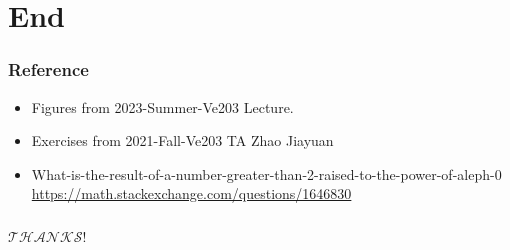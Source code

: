\documentclass{beamer}
\begin{document}
\section{End}

\begin{frame}
    \frametitle{Reference}

    \begin{itemize}
        \item Figures from 2023-Summer-Ve203 Lecture.
        \item Exercises from 2021-Fall-Ve203 TA Zhao Jiayuan
        \item What-is-the-result-of-a-number-greater-than-2-raised-to-the-power-of-aleph-0
        \url{https://math.stackexchange.com/questions/1646830}
    \end{itemize}

\end{frame}
\begin{frame}
    \frametitle{}

    \begin{center}
        \Huge{$\mathcal{THANKS}$!}
    \end{center}

\end{frame}
\end{document}
